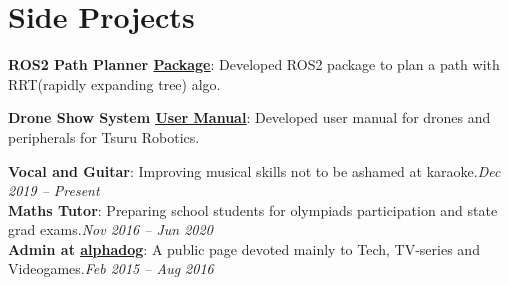 \section{Side Projects}
\resumeSubHeadingListStart

      \resumeProjectHeading
      {\textbf{ROS2 Path Planner \href{https://github.com/aaptss/route_planning_ros2}{\underline{Package}}}{: Developed ROS2 package to plan a path with RRT(rapidly expanding tree) algo.}}

      \resumeProjectHeading
      {\textbf{Drone Show System \href{https://1drv.ms/b/s!ArpOOOargz4JnrknqVsAlp5fFtk6iA}{\underline{User Manual}}}{: Developed user manual for drones and peripherals for Tsuru Robotics.}}

      \resumeProjectHeading
      {\textbf{Vocal and Guitar}{: Improving musical skills not to be ashamed at karaoke.}}{\emph{Dec 2019 -- Present}} \\
      
      \resumeProjectHeading
      {\textbf{Maths Tutor}{: Preparing school students for olympiads participation and state grad exams.}}{\emph{Nov 2016 -- Jun 2020}} \\
      
      \resumeProjectHeading
      {\textbf{Admin at \href{https://vk.com/alpha_dogs}{\underline{alphadog}}}{: A public page devoted mainly to Tech, TV-series and Videogames.}}{\emph{Feb 2015 -- Aug 2016}} \\
      
\resumeSubHeadingListEnd